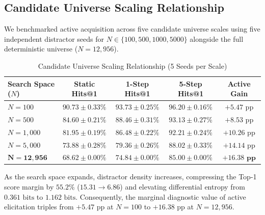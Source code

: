 \documentclass[conference]{IEEEtran}
\begin{document}
\subsection{Candidate Universe Scaling Relationship}
We benchmarked active acquisition across five candidate universe scales using five independent distractor seeds for $N \in \{100, 500, 1000, 5000\}$ alongside the full deterministic universe ($N=12,956$).

\begin{table}[htbp]
\caption{Candidate Universe Scaling Relationship (5 Seeds per Scale)}
\begin{center}
\begin{tabular}{lcccc}
\toprule
\textbf{Search Space ($N$)} & \textbf{Static Hits@1} & \textbf{1-Step Hits@1} & \textbf{5-Step Hits@1} & \textbf{Active Gain} \\
\midrule
$N = 100$ & $90.73 \pm 0.33\%$ & $93.73 \pm 0.25\%$ & $96.20 \pm 0.16\%$ & $+5.47\text{ pp}$ \\
$N = 500$ & $84.60 \pm 0.21\%$ & $88.46 \pm 0.31\%$ & $93.13 \pm 0.27\%$ & $+8.53\text{ pp}$ \\
$N = 1,000$ & $81.95 \pm 0.19\%$ & $86.48 \pm 0.22\%$ & $92.21 \pm 0.24\%$ & $+10.26\text{ pp}$ \\
$N = 5,000$ & $73.88 \pm 0.28\%$ & $79.36 \pm 0.26\%$ & $88.02 \pm 0.33\%$ & $+14.14\text{ pp}$ \\
$\mathbf{N = 12,956}$ & $\mathbf{68.62 \pm 0.00\%}$ & $\mathbf{74.84 \pm 0.00\%}$ & $\mathbf{85.00 \pm 0.00\%}$ & $\mathbf{+16.38\text{ pp}}$ \\
\bottomrule
\end{tabular}
\label{tab:scaling}
\end{center}
\end{table}

As the search space expands, distractor density increases, compressing the Top-1 score margin by $55.2\%$ ($15.31 \rightarrow 6.86$) and elevating differential entropy from $0.361\text{ bits}$ to $1.162\text{ bits}$. Consequently, the marginal diagnostic value of active elicitation triples from $+5.47\text{ pp}$ at $N=100$ to $+16.38\text{ pp}$ at $N=12,956$.
\end{document}
